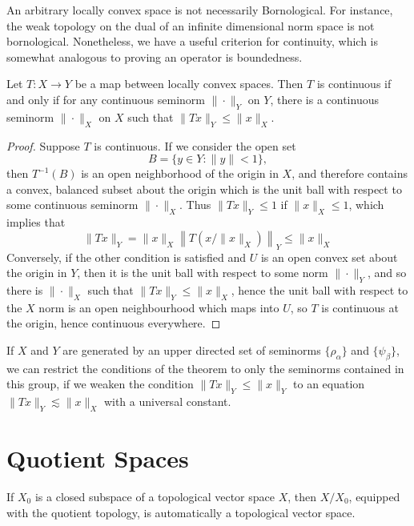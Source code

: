 An arbitrary locally convex space is not necessarily Bornological. For instance, the weak topology on the dual of an infinite dimensional norm space is not bornological. Nonetheless, we have a useful criterion for continuity, which is somewhat analogous to proving an operator is boundedness.

\begin{theorem}
    Let $T: X \to Y$ be a map between locally convex spaces. Then $T$ is continuous if and only if for any continuous seminorm $\| \cdot \|_Y$ on $Y$, there is a continuous seminorm $\| \cdot \|_X$ on $X$ such that $\| Tx \|_Y \leq \| x \|_X$.
\end{theorem}
\begin{proof}
    Suppose $T$ is continuous. If we consider the open set
    \[ B = \{ y \in Y: \| y \| < 1 \}, \]
    then $T^{-1}(B)$ is an open neighborhood of the origin in $X$, and therefore contains a convex, balanced subset about the origin which is the unit ball with respect to some continuous seminorm $\| \cdot \|_X$. Thus $\| Tx \|_Y \leq 1$ if $\| x \|_X \leq 1$, which implies that
    \[ \| Tx \|_Y = \| x \|_X \left\| T \left( x/\|x \|_X \right) \right\|_Y \leq \| x \|_X \]
    Conversely, if the other condition is satisfied and $U$ is an open convex set about the origin in $Y$, then it is the unit ball with respect to some norm $\| \cdot \|_Y$, and so there is $\| \cdot \|_X$ such that $\| Tx \|_Y \leq \| x \|_X$, hence the unit ball with respect to the $X$ norm is an open neighbourhood which maps into $U$, so $T$ is continuous at the origin, hence continuous everywhere.
\end{proof}

If $X$ and $Y$ are generated by an upper directed set of seminorms $\{ \rho_\alpha \}$ and $\{ \psi_\beta \}$, we can restrict the conditions of the theorem to only the seminorms contained in this group, if we weaken the condition $\| Tx \|_Y \leq \| x \|_Y$ to an equation $\| Tx \|_Y \lesssim \| x \|_X$ with a universal constant.

\section{Quotient Spaces}

If $X_0$ is a closed subspace of a topological vector space $X$, then $X/X_0$, equipped with the quotient topology, is automatically a topological vector space.

